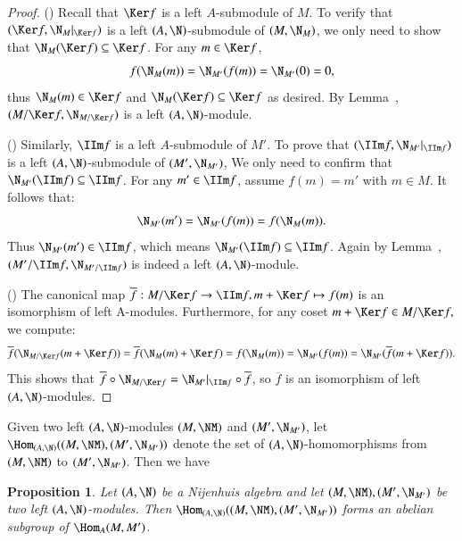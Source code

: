 \documentclass[12pt]{amsart}
\newtheorem{prop}[theorem]{Proposition}
\theoremstyle{definition}
\begin{document}
\begin{proof} 

() Recall that  $\Ker f$ is a left $A$-submodule of $M$. To verify that $(\Ker f, \N_{M}|_{\Ker f})$ is a left $(A,\N)$-submodule of $(M,\N_M)$, we only need to show that $\N_M(\Ker f) \subseteq \Ker f$. For any $m \in \Ker f$,
\[
f(\N_M(m))=\N_{M'}(f(m))=\N_{M'}(0)=0,
\]
thus $\N_M(m) \in \Ker f$ and $\N_M(\Ker f) \subseteq \Ker f$ as desired. By Lemma~, $(M/\Ker f, \N_{M/\Ker f})$ is a left $(A,\N)$-module.  


()  Similarly, $\IIm f$ is a left $A$-submodule of $M'$. To prove that $(\IIm f, \N_{M'}|_{\IIm f})$ is a left $(A,\N)$-submodule of $(M',\N_{M'})$, We only need to confirm that $\N_{M'}(\IIm f) \subseteq \IIm f$. For any $m' \in \IIm f$, assume $f(m)=m'$ with $m \in M$. It follows that:
\[
\N_{M'}(m')=\N_{M'}(f(m))=f(\N_M(m)).
\]
Thus $\N_{M'}(m') \in \IIm f$, which means $\N_{M'}(\IIm f) \subseteq \IIm f$. Again by Lemma~, $(M'/\IIm f, \N_{M'/\IIm f})$ is indeed  a left $(A,\N)$-module. 

() The canonical map $\overline{f}:M/\Ker f \to \IIm f, m+\Ker f \mapsto f(m)$ is an isomorphism of left A-modules. Furthermore, for any coset $m+\Ker f\in  M/\Ker f,$ we compute:
\[
\overline{f}(\N_{M/\Ker f}(m+\Ker f))=\overline{f}(\N_M(m)+\Ker f)=f(\N_M(m))=\N_{M'}(f(m))=\N_{M'} (\overline{f}(m+\Ker f)).
\]
This shows that $\overline{f} \circ \N_{M/\Ker f}= \N_{M'}|_{\IIm f} \circ \overline{f}$, so $\overline{f}$ is an isomorphism of left $(A,\N)$-modules.
\end{proof}

Given two left $(A,\N)$-modules $(M,\NM)$ and $(M',\N_{M'})$, let $\Hom_{(A,\N)}((M,\NM), (M',\N_{M'}))$ denote the set of $(A,\N)$-homomorphisms from $(M,\NM)$ to $(M',\N_{M'})$. Then we have

\begin{prop}
Let $(A,\N)$ be a Nijenhuis algebra and let $(M,\NM), (M',\N_{M'})$ be two left $(A,\N)$-modules. Then $\Hom_{(A,\N)}((M,\NM),(M',\N_{M'}))$ forms an abelian subgroup of $\Hom_A(M,M')$.
\end{prop}
\end{document}
